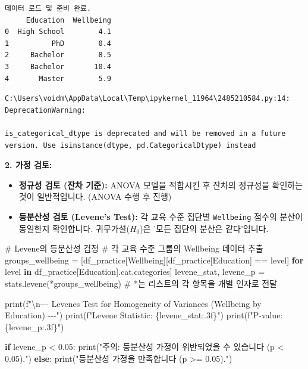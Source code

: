 \documentclass[
  letterpaper,
]{book}
\newenvironment{Shaded}{\begin{snugshade}}{\end{snugshade}}
\newcommand{\BuiltInTok}[1]{\textcolor[rgb]{0.00,0.23,0.31}{#1}}
\newcommand{\CharTok}[1]{\textcolor[rgb]{0.13,0.47,0.30}{#1}}
\newcommand{\CommentTok}[1]{\textcolor[rgb]{0.37,0.37,0.37}{#1}}
\newcommand{\ControlFlowTok}[1]{\textcolor[rgb]{0.00,0.23,0.31}{\textbf{#1}}}
\newcommand{\FloatTok}[1]{\textcolor[rgb]{0.68,0.00,0.00}{#1}}
\newcommand{\KeywordTok}[1]{\textcolor[rgb]{0.00,0.23,0.31}{\textbf{#1}}}
\newcommand{\NormalTok}[1]{\textcolor[rgb]{0.00,0.23,0.31}{#1}}
\newcommand{\OperatorTok}[1]{\textcolor[rgb]{0.37,0.37,0.37}{#1}}
\newcommand{\SpecialCharTok}[1]{\textcolor[rgb]{0.37,0.37,0.37}{#1}}
\newcommand{\SpecialStringTok}[1]{\textcolor[rgb]{0.13,0.47,0.30}{#1}}
\newcommand{\StringTok}[1]{\textcolor[rgb]{0.13,0.47,0.30}{#1}}
\providecommand{\tightlist}{%
  \setlength{\itemsep}{0pt}\setlength{\parskip}{0pt}}
\begin{document}
\begin{verbatim}
데이터 로드 및 준비 완료.
     Education  Wellbeing
0  High School        4.1
1          PhD        0.4
2     Bachelor        8.5
3     Bachelor       10.4
4       Master        5.9
\end{verbatim}

\begin{verbatim}
C:\Users\voidm\AppData\Local\Temp\ipykernel_11964\2485210584.py:14: DeprecationWarning:

is_categorical_dtype is deprecated and will be removed in a future version. Use isinstance(dtype, pd.CategoricalDtype) instead
\end{verbatim}

\textbf{2. 가정 검토:}

\begin{itemize}
\tightlist
\item
  \textbf{정규성 검토 (잔차 기준):} ANOVA 모델을 적합시킨 후 잔차의
  정규성을 확인하는 것이 일반적입니다. (ANOVA 수행 후 진행)
\item
  \textbf{등분산성 검토 (Levene's Test):} 각 교육 수준 집단별
  \texttt{Wellbeing} 점수의 분산이 동일한지 확인합니다.
  귀무가설(\(H_0\))은 '모든 집단의 분산은 같다'입니다.
\end{itemize}

\begin{Shaded}
\begin{Highlighting}[]
    \CommentTok{\# Levene의 등분산성 검정}
    \CommentTok{\# 각 교육 수준 그룹의 Wellbeing 데이터 추출}
\NormalTok{    groups\_wellbeing }\OperatorTok{=}\NormalTok{ [df\_practice[}\StringTok{\textquotesingle{}Wellbeing\textquotesingle{}}\NormalTok{][df\_practice[}\StringTok{\textquotesingle{}Education\textquotesingle{}}\NormalTok{] }\OperatorTok{==}\NormalTok{ level] }\ControlFlowTok{for}\NormalTok{ level }\KeywordTok{in}\NormalTok{ df\_practice[}\StringTok{\textquotesingle{}Education\textquotesingle{}}\NormalTok{].cat.categories]}
\NormalTok{    levene\_stat, levene\_p }\OperatorTok{=}\NormalTok{ stats.levene(}\OperatorTok{*}\NormalTok{groups\_wellbeing) }\CommentTok{\# *는 리스트의 각 항목을 개별 인자로 전달}

    \BuiltInTok{print}\NormalTok{(}\SpecialStringTok{f"}\CharTok{\textbackslash{}n}\SpecialStringTok{{-}{-}{-} Levene\textquotesingle{}s Test for Homogeneity of Variances (Wellbeing by Education) {-}{-}{-}"}\NormalTok{)}
    \BuiltInTok{print}\NormalTok{(}\SpecialStringTok{f"Levene Statistic: }\SpecialCharTok{\{}\NormalTok{levene\_stat}\SpecialCharTok{:.3f\}}\SpecialStringTok{"}\NormalTok{)}
    \BuiltInTok{print}\NormalTok{(}\SpecialStringTok{f"P{-}value: }\SpecialCharTok{\{}\NormalTok{levene\_p}\SpecialCharTok{:.3f\}}\SpecialStringTok{"}\NormalTok{)}

    \ControlFlowTok{if}\NormalTok{ levene\_p }\OperatorTok{\textless{}} \FloatTok{0.05}\NormalTok{:}
        \BuiltInTok{print}\NormalTok{(}\StringTok{"주의: 등분산성 가정이 위반되었을 수 있습니다 (p \textless{} 0.05)."}\NormalTok{)}
    \ControlFlowTok{else}\NormalTok{:}
        \BuiltInTok{print}\NormalTok{(}\StringTok{"등분산성 가정을 만족합니다 (p \textgreater{}= 0.05)."}\NormalTok{)}
\end{Highlighting}
\end{Shaded}
\end{document}
